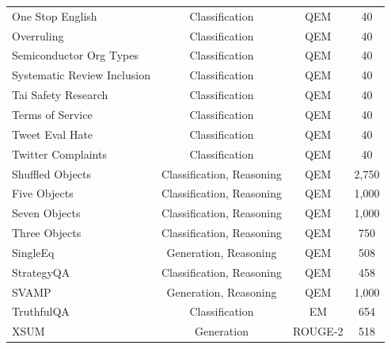 \begin{table}[htbp]
{\begin{tabular}{lccc}
\hspace{0.5cm}One Stop English &Classification &QEM &40 \\
\hspace{0.5cm}Overruling &Classification &QEM &40 \\
\hspace{0.5cm}Semiconductor Org Types &Classification &QEM &40 \\
\hspace{0.5cm}Systematic Review Inclusion &Classification &QEM &40 \\
\hspace{0.5cm}Tai Safety Research &Classification &QEM &40 \\
\hspace{0.5cm}Terms of Service &Classification &QEM &40 \\
\hspace{0.5cm}Tweet Eval Hate &Classification &QEM &40 \\
\hspace{0.5cm}Twitter Complaints &Classification &QEM &40 \\
Shuffled Objects \citep{srivastava2023imitation} & Classification, Reasoning & QEM & 2,750\\
\hspace{0.5cm}Five Objects &  Classification, Reasoning & QEM & 1,000\\
\hspace{0.5cm}Seven Objects &  Classification, Reasoning & QEM & 1,000\\
\hspace{0.5cm}Three Objects &  Classification, Reasoning & QEM & 750\\
SingleEq \citep{koncel-kedziorski-etal-2016-mawps} &Generation, Reasoning &QEM &508 \\
StrategyQA \citep{geva2021did, srivastava2023imitation} & Classification, Reasoning & QEM & 458\\
SVAMP \citep{patel2021nlp} & Generation, Reasoning &QEM &1,000 \\
TruthfulQA \citep{lin-etal-2022-truthfulqa} & Classification &EM &654 \\
XSUM \citep{narayan2018dont} & Generation & ROUGE-2 & 518 \\
\bottomrule
\end{tabular}
}
\end{table}
